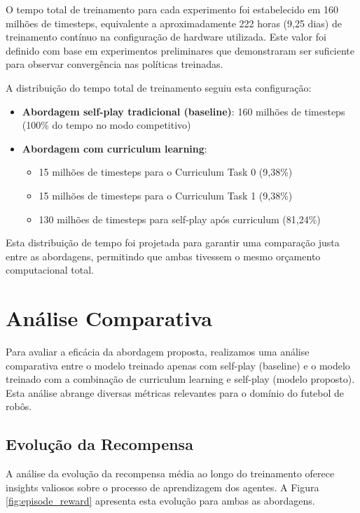 O tempo total de treinamento para cada experimento foi estabelecido em 160 milhões de timesteps, equivalente a aproximadamente 222 horas (9,25 dias) de treinamento contínuo na configuração de hardware utilizada. Este valor foi definido com base em experimentos preliminares que demonstraram ser suficiente para observar convergência nas políticas treinadas.

A distribuição do tempo total de treinamento seguiu esta configuração:

\begin{itemize}
    \item \textbf{Abordagem self-play tradicional (baseline)}: 160 milhões de timesteps (100\% do tempo no modo competitivo)
    \item \textbf{Abordagem com curriculum learning}: 
    \begin{itemize}
        \item 15 milhões de timesteps para o Curriculum Task 0 (9,38\%)
        \item 15 milhões de timesteps para o Curriculum Task 1 (9,38\%)
        \item 130 milhões de timesteps para self-play após curriculum (81,24\%)
    \end{itemize}
\end{itemize}

Esta distribuição de tempo foi projetada para garantir uma comparação justa entre as abordagens, permitindo que ambas tivessem o mesmo orçamento computacional total.

\section{Análise Comparativa}
\label{sec:analise_comparativa}

Para avaliar a eficácia da abordagem proposta, realizamos uma análise comparativa entre o modelo treinado apenas com self-play (baseline) e o modelo treinado com a combinação de curriculum learning e self-play (modelo proposto). Esta análise abrange diversas métricas relevantes para o domínio do futebol de robôs.

\subsection{Evolução da Recompensa}

A análise da evolução da recompensa média ao longo do treinamento oferece insights valiosos sobre o processo de aprendizagem dos agentes. A Figura \ref{fig:episode_reward} apresenta esta evolução para ambas as abordagens.

